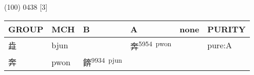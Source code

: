 \documentclass[14pt,a4paper]{scrartcl}
\begin{document}
(100) 0438 {[}3{]}

\begin{longtable}[c]{@{}llllll@{}}
\toprule
\begin{minipage}[b]{0.14\columnwidth}\raggedright\strut
GROUP
\strut\end{minipage} &
\begin{minipage}[b]{0.14\columnwidth}\raggedright\strut
MCH
\strut\end{minipage} &
\begin{minipage}[b]{0.14\columnwidth}\raggedright\strut
B
\strut\end{minipage} &
\begin{minipage}[b]{0.14\columnwidth}\raggedright\strut
A
\strut\end{minipage} &
\begin{minipage}[b]{0.14\columnwidth}\raggedright\strut
none
\strut\end{minipage} &
\begin{minipage}[b]{0.14\columnwidth}\raggedright\strut
PURITY
\strut\end{minipage}\tabularnewline
\midrule
\endhead
\begin{minipage}[t]{0.14\columnwidth}\raggedright\strut
歮
\strut\end{minipage} &
\begin{minipage}[t]{0.14\columnwidth}\raggedright\strut
bjun
\strut\end{minipage} &
\begin{minipage}[t]{0.14\columnwidth}\raggedright\strut
\strut\end{minipage} &
\begin{minipage}[t]{0.14\columnwidth}\raggedright\strut
奔\textsuperscript{5954~pwon}
\strut\end{minipage} &
\begin{minipage}[t]{0.14\columnwidth}\raggedright\strut
\strut\end{minipage} &
\begin{minipage}[t]{0.14\columnwidth}\raggedright\strut
pure:A
\strut\end{minipage}\tabularnewline
\begin{minipage}[t]{0.14\columnwidth}\raggedright\strut
奔
\strut\end{minipage} &
\begin{minipage}[t]{0.14\columnwidth}\raggedright\strut
pwon
\strut\end{minipage} &
\begin{minipage}[t]{0.14\columnwidth}\raggedright\strut
餴\textsuperscript{9934~pjun}

\end{minipage}
\end{longtable}
\end{document}
